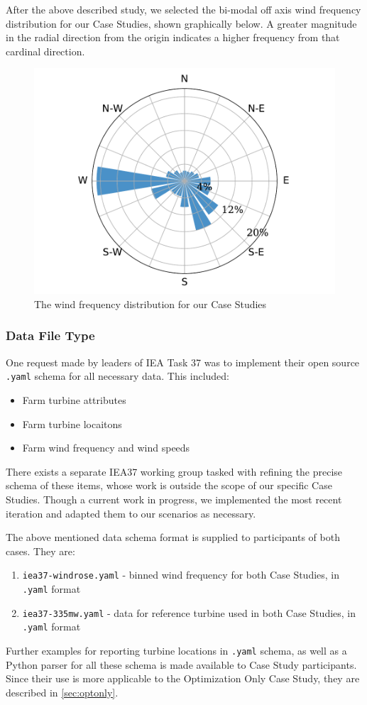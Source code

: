 	After the above described study, we selected the bi-modal off axis wind frequency distribution for our Case Studies, shown graphically below.
	A greater magnitude in the radial direction from the origin indicates a higher frequency from that cardinal direction.
	
	\begin{figure}[H]
		\centering \includegraphics[width=.5\textwidth]{./figures/windrose.pdf}
		\caption{The wind frequency distribution for our Case Studies}
		\label{fig:freqdist}
	\end{figure}

\subsubsection{Data File Type} \label{sec:filetypes}
	One request made by leaders of IEA Task 37 was to implement their open source \texttt{.yaml} schema for all necessary data.
	This included:
	\begin{itemize}
		\item{Farm turbine attributes}
		\item{Farm turbine locaitons}
		\item{Farm wind frequency and wind speeds}
	\end{itemize}

	There exists a separate IEA37 working group tasked with refining the precise schema of these items, whose work is outside the scope of our specific Case Studies.
	Though a current work in progress, we implemented the most recent iteration and adapted them to our scenarios as necessary.

	The above mentioned data schema format is supplied to participants of both cases. They are:
	\begin{enumerate}
		\item \texttt{iea37-windrose.yaml} - binned wind frequency for both Case Studies, in \texttt{.yaml} format
		\item \texttt{iea37-335mw.yaml} - data for reference turbine used in both Case Studies, in \texttt{.yaml} format
	\end{enumerate}

	Further examples for reporting turbine locations in \texttt{.yaml} schema, as well as a Python parser for all these schema is made available to Case Study participants.
	Since their use is more applicable to the Optimization Only Case Study, they are described in \cref{sec:optonly}.